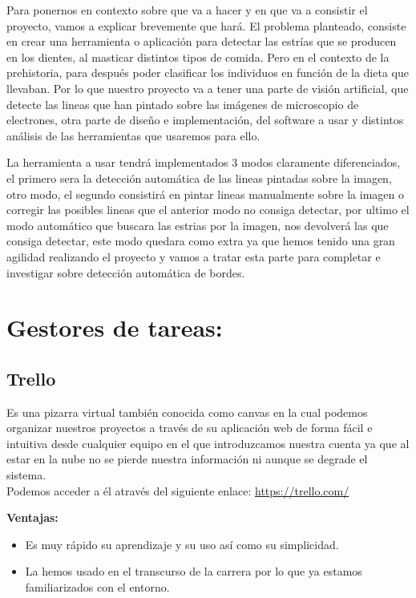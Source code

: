 Para ponernos en contexto sobre que va a hacer y en que va a consistir el proyecto, vamos a explicar brevemente que hará.
El problema planteado, consiste en crear una herramienta o aplicación para detectar las estrías que se producen en los dientes, al masticar distintos tipos de comida.
Pero en el contexto de la prehistoria, para después poder clasificar los individuos en función de la dieta que llevaban.
Por lo que nuestro proyecto va a tener una parte de visión artificial, que detecte las lineas que han pintado sobre las imágenes de microscopio de electrones, otra parte de diseño e implementación, del software a usar y distintos análisis de las herramientas que usaremos para ello.

La herramienta a usar tendrá implementados 3 modos claramente diferenciados, el primero sera la detección automática de las lineas pintadas sobre la imagen, otro modo, el segundo consistirá en pintar lineas manualmente sobre la imagen o corregir las posibles lineas que el anterior modo no consiga detectar, por ultimo el modo automático que buscara las estrias por la imagen, nos devolverá las que consiga detectar, este modo quedara como extra ya que hemos tenido una gran agilidad realizando el proyecto y vamos a tratar esta parte para completar e investigar sobre detección automática de bordes.


\section{Gestores de tareas:}
\subsection{Trello}
Es una pizarra virtual también conocida como canvas en la cual podemos organizar nuestros proyectos a través de su aplicación web de forma fácil e intuitiva desde cualquier equipo en el que introduzcamos nuestra cuenta ya que al estar en la nube no se pierde nuestra información ni aunque se degrade el sistema.\\
Podemos acceder a él através del siguiente enlace: 
\url{https://trello.com/}



\textbf{Ventajas:}

\begin{itemize}
\item Es muy rápido su aprendizaje y su uso así como su simplicidad.

\item La hemos usado en el transcurso de la carrera por lo que ya estamos familiarizados con el entorno.
\end{itemize}

